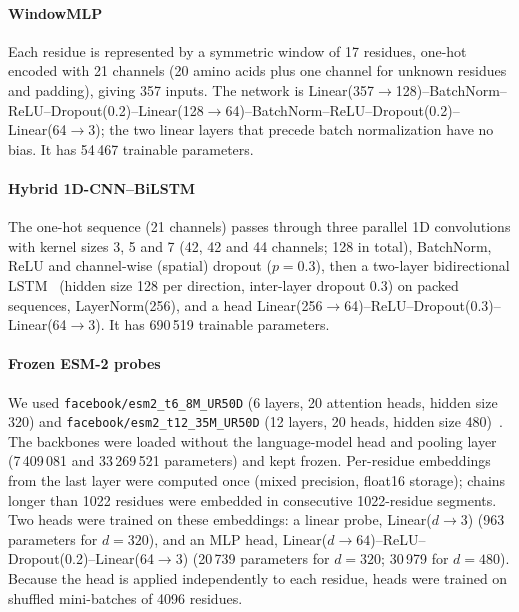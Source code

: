\documentclass[preprint,12pt,authoryear]{elsarticle}
\begin{document}
\paragraph{WindowMLP} Each residue is represented by a symmetric window of 17 residues, one-hot encoded with 21 channels (20 amino acids plus one channel for unknown residues and padding), giving 357 inputs. The network is Linear(357$\to$128)--BatchNorm--ReLU--Dropout(0.2)--Linear(128$\to$64)--BatchNorm--ReLU--Dropout(0.2)--Linear(64$\to$3); the two linear layers that precede batch normalization have no bias. It has 54\,467 trainable parameters.

\paragraph{Hybrid 1D-CNN--BiLSTM} The one-hot sequence (21 channels) passes through three parallel 1D convolutions with kernel sizes 3, 5 and 7 (42, 42 and 44 channels; 128 in total), BatchNorm, ReLU and channel-wise (spatial) dropout ($p=0.3$), then a two-layer bidirectional LSTM~\citep{hochreiter1997long,schuster1997bidirectional} (hidden size 128 per direction, inter-layer dropout 0.3) on packed sequences, LayerNorm(256), and a head Linear(256$\to$64)--ReLU--Dropout(0.3)--Linear(64$\to$3). It has 690\,519 trainable parameters.

\paragraph{Frozen ESM-2 probes} We used \texttt{facebook/esm2\_t6\_8M\_UR50D} (6 layers, 20 attention heads, hidden size 320) and \texttt{facebook/esm2\_t12\_35M\_UR50D} (12 layers, 20 heads, hidden size 480)~\citep{lin2023evolutionary}. The backbones were loaded without the language-model head and pooling layer (7\,409\,081 and 33\,269\,521 parameters) and kept frozen. Per-residue embeddings from the last layer were computed once (mixed precision, float16 storage); chains longer than 1022 residues were embedded in consecutive 1022-residue segments. Two heads were trained on these embeddings: a linear probe, Linear($d \to 3$) (963 parameters for $d=320$), and an MLP head, Linear($d \to 64$)--ReLU--Dropout(0.2)--Linear(64$\to$3) (20\,739 parameters for $d=320$; 30\,979 for $d=480$). Because the head is applied independently to each residue, heads were trained on shuffled mini-batches of 4096 residues.
\end{document}

